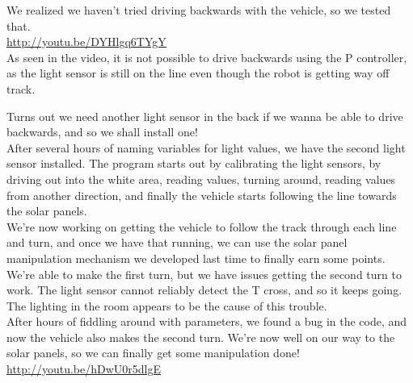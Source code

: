 We realized we haven't tried driving backwards with the vehicle, so we
tested that.\\\url{http://youtu.be/DYHlgq6TYgY}\\As seen in the video,
it is not possible to drive backwards using the P controller, as the
light sensor is still on the line even though the robot is getting way
off track.

Turns out we need another light sensor in the back if we wanna be able
to drive backwards, and so we shall install one!\\After several hours of
naming variables for light values, we have the second light sensor
installed. The program starts out by calibrating the light sensors, by
driving out into the white area, reading values, turning around, reading
values from another direction, and finally the vehicle starts following
the line towards the solar panels.\\We're now working on getting the
vehicle to follow the track through each line and turn, and once we have
that running, we can use the solar panel manipulation mechanism we
developed last time to finally earn some points.\\We're able to make the
first turn, but we have issues getting the second turn to work. The
light sensor cannot reliably detect the T cross, and so it keeps going.
The lighting in the room appears to be the cause of this trouble.\\After
hours of fiddling around with parameters, we found a bug in the code,
and now the vehicle also makes the second turn. We're now well on our
way to the solar panels, so we can finally get some manipulation done!
\url{http://youtu.be/hDwU0r5dlgE}

